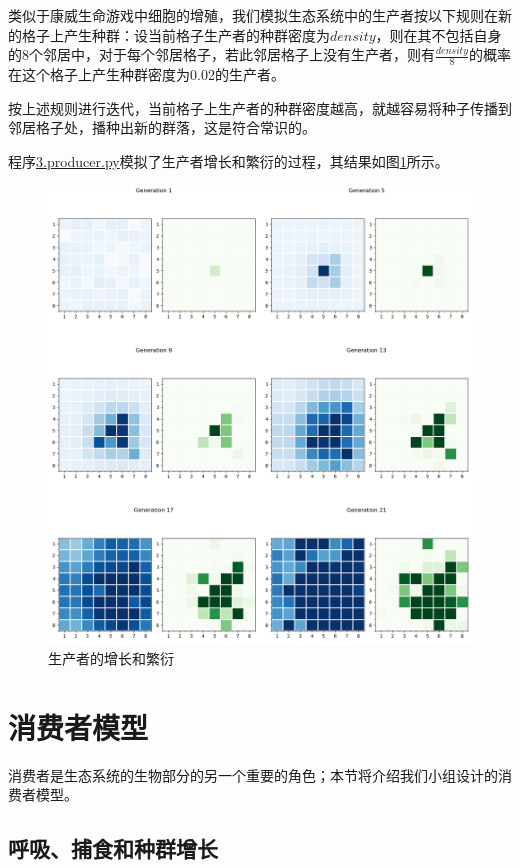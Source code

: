 \documentclass{ctexart}
\begin{document}
类似于康威生命游戏中细胞的增殖，我们模拟生态系统中的生产者按以下规则在新的格子上产生种群：设当前格子生产者的种群密度为$density$，则在其不包括自身的8个邻居中，对于每个邻居格子，若此邻居格子上没有生产者，则有$\frac{density}{8}$的概率在这个格子上产生种群密度为0.02的生产者。

按上述规则进行迭代，当前格子上生产者的种群密度越高，就越容易将种子传播到邻居格子处，播种出新的群落，这是符合常识的。

程序\underline{3.producer.py}模拟了生产者增长和繁衍的过程，其结果如图\ref{fig:producer-growth}所示。

\begin{figure}[ht]
  \centering
  \includegraphics[width=\textwidth]{producer-growth.png}
  \caption{生产者的增长和繁衍}
  \label{fig:producer-growth}
\end{figure}

\section{消费者模型}

消费者是生态系统的生物部分的另一个重要的角色；本节将介绍我们小组设计的消费者模型。

\subsection{呼吸、捕食和种群增长} \label{sec:consumer-growth-rule}
\end{document}
